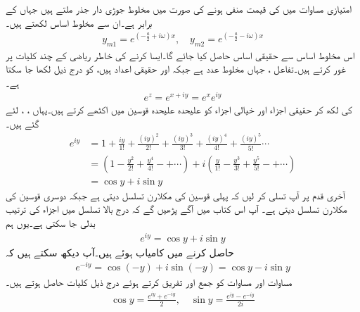 امتیازی مساوات  میں  کی قیمت منفی ہونے کی صورت میں مخلوط جوڑی دار
 جذر  ملتے ہیں جہاں  کے برابر ہے۔ان سے مخلوط اساس لکھتے ہیں۔
\begin{align}\label{مساوات_سادہ_دو_درجی_مخلوط_اساس_الف}
y_{m1}=e^{(-\frac{a}{2}+i\omega)x},\quad y_{m2}=e^{(-\frac{a}{2}-i\omega)x}
\end{align}
اس مخلوط اساس سے حقیقی اساس حاصل کیا جائے گا۔ایسا کرنے کی خاطر ریاضی کے چند کلیات پر غور کرتے ہیں۔تفاعل ، جہاں  مخلوط عدد ہے  جبکہ  اور  حقیقی اعداد ہیں، کو درج ذیل لکھا جا سکتا ہے۔
\begin{align*}
e^z=e^{x+iy}=e^xe^{iy}
\end{align*}
 کی  لکھ کر حقیقی اجزاء اور خیالی اجزاء کو علیحدہ علیحدہ قوسین میں اکٹھے کرتے ہیں۔یہاں ، ،  لئے گئے ہیں۔
\begin{align*}
e^{iy}&=1+\frac{iy}{1!}+\frac{(iy)^2}{2!}+\frac{(iy)^3}{3!}+\frac{(iy)^4}{4!}+\frac{(iy)^5}{5!}\cdots\\
&=\left(1-\frac{y^2}{2!}+\frac{y^4}{4!}-+\cdots\right) +i\left(\frac{y}{1!}-\frac{y^3}{3!}+\frac{y^5}{5!}-+\cdots\right)\\
&=\cos y+i\sin y
\end{align*}
آخری قدم پر آپ تسلی کر لیں کہ پہلی قوسین  کی مکلارن تسلسل دیتی ہے جبکہ دوسری قوسین  کی مکلارن تسلسل دیتی ہے۔ آپ اس کتاب میں آگے پڑھیں گے کہ درج بالا تسلسل میں اجزاء کی ترتیب بدلی جا سکتی ہے۔یوں ہم   
 \begin{align}\label{مساوات_سادہ_دو_درجی_یولر_مساوات_الف}
e^{iy}=\cos y+i\sin y
\end{align}
حاصل کرنے میں کامیاب ہوئے ہیں۔آپ دیکھ سکتے ہیں کہ
\begin{align}\label{مساوات_سادہ_دو_درجی_یولر_مساوات_ب}
e^{-iy}=\cos (-y)+i\sin (-y)=\cos y-i\sin y
\end{align}
مساوات  اور مساوات  کو جمع اور تفریق کرتے ہوئے درج ذیل کلیات حاصل ہوتے ہیں۔
\begin{align}
\cos y=\frac{e^{iy}+e^{-iy}}{2}, \quad \sin y=\frac{e^{iy}-e^{-iy}}{2i}
\end{align}
